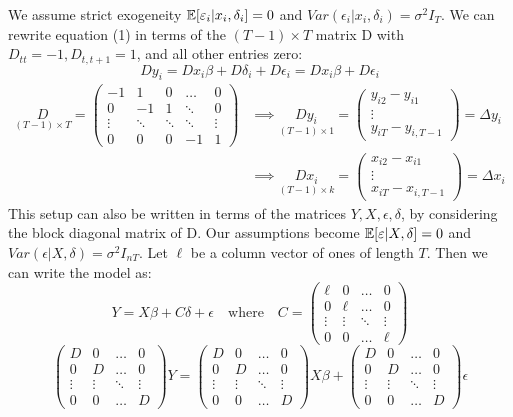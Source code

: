 \documentclass[DIV=14,titlepage=false]{scrreprt}
\begin{document}
We assume strict exogeneity $\mathbb{E}[\varepsilon_i|x_i,\delta_i]=0$ and $Var(\epsilon_i|x_i,\delta_i)=\sigma^2I_T$. We can rewrite equation (1) in terms of the $(T-1)\times T$ matrix D with $D_{tt}=-1,D_{t,t+1}=1$, and all other entries zero: \[ Dy_i = Dx_i \beta + D \delta_i + D \epsilon_i = Dx_i \beta  + D \epsilon_i\]
\begin{align*}
   \underset{(T-1)\times T}{D} =  \begin{pmatrix} -1 & 1 & 0 & \hdots & 0 \\ 0 & -1 & 1 & \ddots & 0\\ \vdots & \ddots & \ddots & \ddots & \vdots \\ 0 & 0 & 0 & -1 & 1 \end{pmatrix} &\implies \underset{(T-1)\times1}{Dy_i} = \begin{pmatrix} y_{i2}-y_{i1} \\ \vdots \\ y_{iT}-y_{i,T-1} \end{pmatrix} = \Delta y_i\\
   &\implies \underset{(T-1)\times k}{Dx_i} = \begin{pmatrix} x_{i2}-x_{i1} \\ \vdots \\ x_{iT}-x_{i,T-1} \end{pmatrix} = \Delta x_i
\end{align*}
This setup can also be written in terms of the matrices $Y,X,\epsilon,\delta$, by considering the block diagonal matrix of D. Our assumptions become $\mathbb{E}[\varepsilon|X,\delta]=0$ and $Var(\epsilon|X,\delta)=\sigma^2I_{nT}$. Let $\ell$ be a column vector of ones of length $T$. Then we can write the model as:
\[ Y =X \beta + C \delta + \epsilon \quad \text{where} \quad C = \begin{pmatrix} \ell & 0 & \hdots & 0 \\ 0 & \ell & \hdots & 0 \\ \vdots & \vdots & \ddots & \vdots \\ 0 & 0 & \hdots & \ell \end{pmatrix} \]
\[
\begin{pmatrix}
    D & 0 & \hdots & 0 \\
    0 & D & \hdots & 0 \\
    \vdots & \vdots & \ddots & \vdots \\
    0 & 0 & \hdots & D
\end{pmatrix} Y = \begin{pmatrix}
    D & 0 & \hdots & 0 \\
    0 & D & \hdots & 0 \\
    \vdots & \vdots & \ddots & \vdots \\
    0 & 0 & \hdots & D \end{pmatrix} X \beta
     + \begin{pmatrix}
        D & 0 & \hdots & 0 \\
        0 & D & \hdots & 0 \\
        \vdots & \vdots & \ddots & \vdots \\
        0 & 0 & \hdots & D \end{pmatrix} \epsilon
\]
\end{document}
